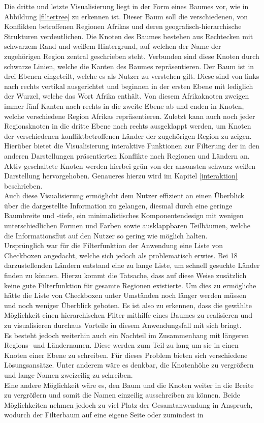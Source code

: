 \documentclass[usegeometry=true]{scrartcl}
\begin{document}
Die dritte und letzte Visualisierung liegt in der Form eines Baumes vor, wie in Abbildung \ref{filtertree} zu erkennen ist. Dieser Baum soll die verschiedenen, von Konflikten betroffenen Regionen Afrikas und deren geografisch-hierarchische Strukturen verdeutlichen. Die Knoten des Baumes bestehen aus Rechtecken mit schwarzem Rand und weißem Hintergrund, auf welchen der Name der zugehörigen Region zentral geschrieben steht. Verbunden sind diese Knoten durch schwarze Linien, welche die Kanten des Baumes repräsentieren. Der Baum ist in drei Ebenen eingeteilt, welche es als Nutzer zu verstehen gilt. Diese sind von links nach rechts vertikal ausgerichtet und beginnen in der ersten Ebene mit lediglich der Wurzel, welche das Wort \glqq Afrika\grqq{} enthält. Von diesem Afrikaknoten zweigen immer fünf Kanten nach rechts in die zweite Ebene ab und enden in Knoten, welche verschiedene Region Afrikas repräsentieren. Zuletzt kann auch noch jeder Regionsknoten in die dritte Ebene nach rechts ausgeklappt werden, um Knoten der verschiedenen konfliktbetroffenen Länder der zugehörigen Region zu zeigen. Hierüber bietet die Visualisierung interaktive Funktionen zur Filterung der in den anderen Darstellungen präsentierten Konflikte nach Regionen und Ländern an. Aktiv geschaltete Knoten werden hierbei grün von der ansonsten schwarz-weißen Darstellung hervorgehoben. Genaueres hierzu wird im Kapitel \ref{interaktion} beschrieben.\\ Auch diese Visualisierung ermöglicht dem Nutzer effizient an einen Überblick über die dargestellte Information zu gelangen, diesmal durch eine geringe Baumbreite und -tiefe, ein minimalistisches Komponentendesign mit wenigen unterschiedlichen Formen und Farben sowie ausklappbaren Teilbäumen, welche die Informationsflut auf den Nutzer so gering wie möglich halten.\\ Ursprünglich war für die Filterfunktion der Anwendung eine Liste von Checkboxen angedacht, welche sich jedoch als problematisch erwies. Bei 18 darzustellenden Ländern entstand eine zu lange Liste, um schnell gesuchte Länder finden zu können. Hierzu kommt die Tatsache, dass auf diese Weise zusätzlich keine gute Filterfunktion für gesamte Regionen existierte. Um dies zu ermögliche hätte die Liste von Checkboxen unter Umständen noch länger werden müssen und noch weniger Überblick geboten. Es ist also zu erkennen, dass die gewählte Möglichkeit einen hierarchischen Filter mithilfe eines Baumes zu realisieren und zu visualisieren durchaus Vorteile in diesem Anwendungsfall mit sich bringt.\\ Es besteht jedoch weiterhin auch ein Nachteil im Zusammenhang mit längeren Regions- und Ländernamen. Diese werden zum Teil zu lang um sie in einen Knoten einer Ebene zu schreiben. Für dieses Problem bieten sich verschiedene Lösungsansätze. Unter anderem wäre es denkbar, die Knotenhöhe zu vergrößern und lange Namen zweizeilig zu schreiben.\\ Eine andere Möglichkeit wäre es, den Baum und die Knoten weiter in die Breite zu vergrößern und somit die Namen einzeilig ausschreiben zu können. Beide Möglichkeiten nehmen jedoch zu viel Platz der Gesamtanwendung in Anspruch, wodurch der Filterbaum auf eine eigene Seite oder zumindest in 
\end{document}
